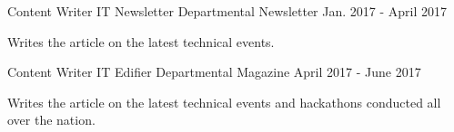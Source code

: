\begin{cventries}
  \cventry
    {Content Writer}
    {IT Newsletter}
    {Departmental Newsletter}
    {Jan. 2017 - April 2017}
    {
      \begin{cvitems}
        \item {Writes the article on the latest technical events.}
      \end{cvitems}
    }
    
     \cventry
    {Content Writer}
    {IT Edifier}
    {Departmental Magazine}
    {April 2017 - June 2017}
    {
      \begin{cvitems}
        \item {Writes the article on the latest technical events and hackathons conducted all over the nation.}
      \end{cvitems}
    }
 
\end{cventries}